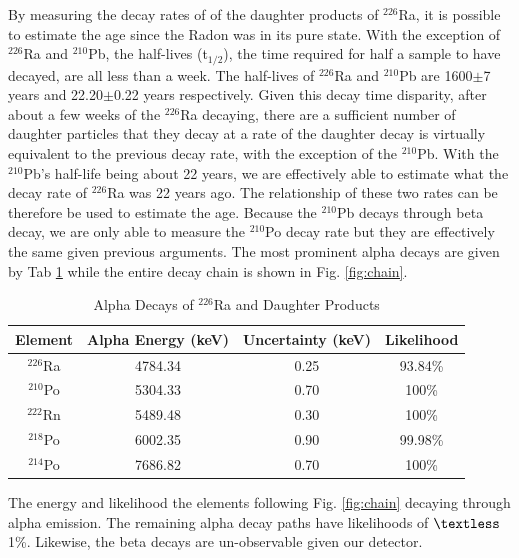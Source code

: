 \documentclass[10pt]{IEEEtran}
\begin{document}
By measuring the decay rates of of the daughter products of $^{226}$Ra, it is possible to estimate the age since the Radon was in its pure state.\cite{blackboard} With the exception of $^{226}$Ra and $^{210}$Pb, the half-lives (t$_{1/2}$), the time required for half a sample to have decayed, are all less than a week. The half-lives of $^{226}$Ra and $^{210}$Pb are 1600$\pm$7 years and 22.20$\pm$0.22 years respectively.\cite{sonzogni} Given this decay time disparity, after about a few weeks of the $^{226}$Ra decaying, there are a sufficient number of daughter particles that they decay at a rate of the daughter decay is virtually equivalent to the previous decay rate, with the exception of the $^{210}$Pb. With the $^{210}$Pb's half-life being about 22 years, we are effectively able to estimate what the decay rate of $^{226}$Ra was 22 years ago. The relationship of these two rates can be therefore be used to estimate the age. Because the $^{210}$Pb decays through beta decay, we are only able to measure the $^{210}$Po decay rate but they are effectively the same given previous arguments. The most prominent alpha decays are given by Tab \ref{tab:decays} while the entire decay chain is shown in Fig. \ref{fig:chain}.
    \begin{table}[!h]
        \begin{center}
        \caption{Alpha Decays of $^{226}$Ra and Daughter Products}
        \label{tab:decays}
        \begin{tabular}{|c|c|c|c|}
            \hline
            Element & Alpha Energy (keV) & Uncertainty (keV) & Likelihood \\
            \hline
            $^{226}$Ra & 4784.34 & 0.25 & 93.84\% \\
            \hline
            $^{210}$Po & 5304.33 & 0.70 & 100\% \\ 
            \hline         
            $^{222}$Rn & 5489.48 & 0.30 & 100\% \\
            \hline
            $^{218}$Po & 6002.35 & 0.90 & 99.98\% \\
            \hline
            $^{214}$Po & 7686.82 & 0.70 & 100\% \\
            \hline
        \end{tabular}
        \end{center}
        The energy and likelihood the elements following Fig. \ref{fig:chain} decaying through alpha emission. The remaining alpha decay paths have likelihoods of $\textless$ 1\%\cite{sonzogni}. Likewise, the beta decays are un-observable given our detector\cite{blackboard}.
    \end{table}
\end{document}
